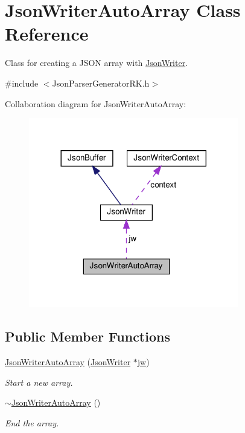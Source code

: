 \hypertarget{class_json_writer_auto_array}{}\section{Json\+Writer\+Auto\+Array Class Reference}
\label{class_json_writer_auto_array}


Class for creating a J\+S\+ON array with \hyperlink{class_json_writer}{Json\+Writer}.  




{\ttfamily \#include $<$Json\+Parser\+Generator\+R\+K.\+h$>$}



Collaboration diagram for Json\+Writer\+Auto\+Array\+:
\nopagebreak
\begin{figure}[H]
\begin{center}
\leavevmode
\includegraphics[width=260pt]{class_json_writer_auto_array__coll__graph}
\end{center}
\end{figure}
\subsection*{Public Member Functions}
\begin{DoxyCompactItemize}
\item 
\hyperlink{class_json_writer_auto_array_a6bfd8fc01e5bcdd38cbf4b1c2e91637b}{Json\+Writer\+Auto\+Array} (\hyperlink{class_json_writer}{Json\+Writer} $\ast$\hyperlink{class_json_writer_auto_array_a747001de80facbc7a782a9e14ad2acae}{jw})
\begin{DoxyCompactList}\small\item\em Start a new array. \end{DoxyCompactList}\item 
\hyperlink{class_json_writer_auto_array_a2554fc87e46846becf528e878d043bc0}{$\sim$\+Json\+Writer\+Auto\+Array} ()
\begin{DoxyCompactList}\small\item\em End the array. \end{DoxyCompactList}\end{DoxyCompactItemize}
